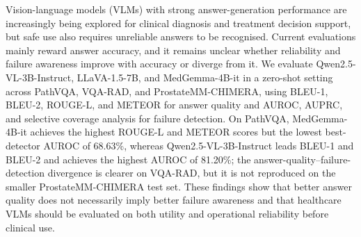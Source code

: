 Vision-language models (VLMs) with strong answer-generation performance are increasingly being explored for clinical diagnosis and treatment decision support, but safe use also requires unreliable answers to be recognised. Current evaluations mainly reward answer accuracy, and it remains unclear whether reliability and failure awareness improve with accuracy or diverge from it. We evaluate Qwen2.5-VL-3B-Instruct, LLaVA-1.5-7B, and MedGemma-4B-it in a zero-shot setting across PathVQA, VQA-RAD, and ProstateMM-CHIMERA, using BLEU-1, BLEU-2, ROUGE-L, and METEOR for answer quality and AUROC, AUPRC, and selective coverage analysis for failure detection. On PathVQA, MedGemma-4B-it achieves the highest ROUGE-L and METEOR scores but the lowest best-detector AUROC of 68.63\%, whereas Qwen2.5-VL-3B-Instruct leads BLEU-1 and BLEU-2 and achieves the highest AUROC of 81.20\%; the answer-quality--failure-detection divergence is clearer on VQA-RAD, but it is not reproduced on the smaller ProstateMM-CHIMERA test set. These findings show that better answer quality does not necessarily imply better failure awareness and that healthcare VLMs should be evaluated on both utility and operational reliability before clinical use.
